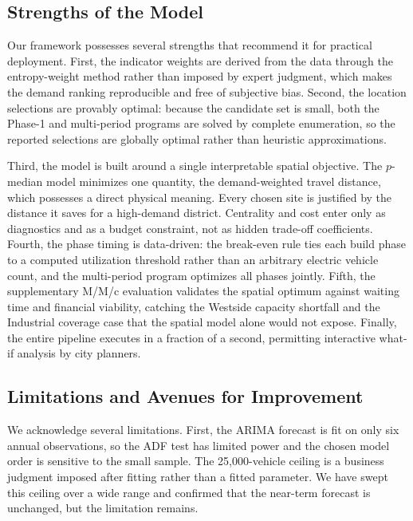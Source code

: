 \documentclass[11pt]{article}
\begin{document}
\subsection{Strengths of the Model}

Our framework possesses several strengths that recommend it for practical deployment. First, the indicator weights are derived from the data through the entropy-weight method rather than imposed by expert judgment, which makes the demand ranking reproducible and free of subjective bias. Second, the location selections are provably optimal: because the candidate set is small, both the Phase-1 and multi-period programs are solved by complete enumeration, so the reported selections are globally optimal rather than heuristic approximations.

Third, the model is built around a single interpretable spatial objective. The $p$-median model minimizes one quantity, the demand-weighted travel distance, which possesses a direct physical meaning. Every chosen site is justified by the distance it saves for a high-demand district. Centrality and cost enter only as diagnostics and as a budget constraint, not as hidden trade-off coefficients. Fourth, the phase timing is data-driven: the break-even rule ties each build phase to a computed utilization threshold rather than an arbitrary electric vehicle count, and the multi-period program optimizes all phases jointly. Fifth, the supplementary M/M/c evaluation validates the spatial optimum against waiting time and financial viability, catching the Westside capacity shortfall and the Industrial coverage case that the spatial model alone would not expose. Finally, the entire pipeline executes in a fraction of a second, permitting interactive what-if analysis by city planners.

\subsection{Limitations and Avenues for Improvement}
\label{subsec:limitations}

We acknowledge several limitations. First, the ARIMA forecast is fit on only six annual observations, so the ADF test has limited power and the chosen model order is sensitive to the small sample. The 25{,}000-vehicle ceiling is a business judgment imposed after fitting rather than a fitted parameter. We have swept this ceiling over a wide range and confirmed that the near-term forecast is unchanged, but the limitation remains.
\end{document}
